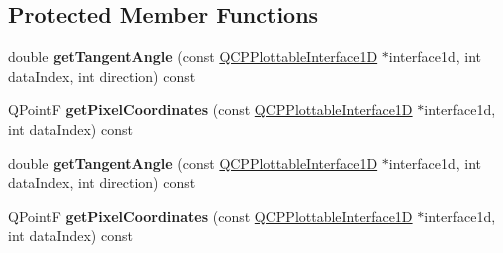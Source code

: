 \subsection*{Protected Member Functions}
\begin{DoxyCompactItemize}
\item 
double {\bfseries get\+Tangent\+Angle} (const \hyperlink{class_q_c_p_plottable_interface1_d}{Q\+C\+P\+Plottable\+Interface1D} $\ast$interface1d, int data\+Index, int direction) const \hypertarget{class_q_c_p_selection_decorator_bracket_afa0dedceebf14787e4224ddecb0ed7cd}{}\label{class_q_c_p_selection_decorator_bracket_afa0dedceebf14787e4224ddecb0ed7cd}

\item 
Q\+PointF {\bfseries get\+Pixel\+Coordinates} (const \hyperlink{class_q_c_p_plottable_interface1_d}{Q\+C\+P\+Plottable\+Interface1D} $\ast$interface1d, int data\+Index) const \hypertarget{class_q_c_p_selection_decorator_bracket_aba1d088001663f3a1c367aab59793773}{}\label{class_q_c_p_selection_decorator_bracket_aba1d088001663f3a1c367aab59793773}

\item 
double {\bfseries get\+Tangent\+Angle} (const \hyperlink{class_q_c_p_plottable_interface1_d}{Q\+C\+P\+Plottable\+Interface1D} $\ast$interface1d, int data\+Index, int direction) const \hypertarget{class_q_c_p_selection_decorator_bracket_afa0dedceebf14787e4224ddecb0ed7cd}{}\label{class_q_c_p_selection_decorator_bracket_afa0dedceebf14787e4224ddecb0ed7cd}

\item 
Q\+PointF {\bfseries get\+Pixel\+Coordinates} (const \hyperlink{class_q_c_p_plottable_interface1_d}{Q\+C\+P\+Plottable\+Interface1D} $\ast$interface1d, int data\+Index) const \hypertarget{class_q_c_p_selection_decorator_bracket_aba1d088001663f3a1c367aab59793773}{}\label{class_q_c_p_selection_decorator_bracket_aba1d088001663f3a1c367aab59793773}

\end{DoxyCompactItemize}
